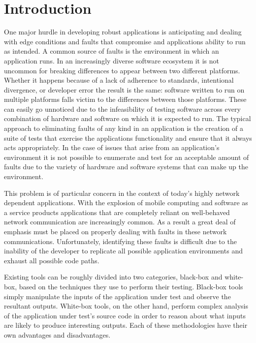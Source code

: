 \section{Introduction}

    One major hurdle in developing robust applications is anticipating and dealing with edge conditions and faults that
    compromise and applications ability to run as intended. A common source of faults is the environment in which an
    application runs. In an increasingly diverse software ecosystem it is not uncommon for breaking differences to
    appear between two different platforms. Whether it happens because of a lack of adherence to standards, intentional
    divergence, or developer error the result is the same: software written to run on multiple platforms falls victim to
    the differences between those platforms. These can easily go unnoticed due to the infeasibility of testing software
    across every combination of hardware and software on which it is expected to run. The typical approach to
    eliminating faults of any kind in an application is the creation of a suite of tests that exercise the applications
    functionality and ensure that it always acts appropriately. In the case of issues that arise from an application's
    environment it is not possible to enumerate and test for an acceptable amount of faults due to the variety of
    hardware and software systems that can make up the environment.

    This problem is of particular concern in the context of today's highly network dependent applications. With the
    explosion of mobile computing and software as a service products applications that are completely reliant on
    well-behaved network communication are increasingly common. As a result a great deal of emphasis must be placed on
    properly dealing with faults in these network communications. Unfortunately, identifying these faults is difficult
    due to the inability of the developer to replicate all possible application environments and exhaust all possible
    code paths.

    Existing tools can be roughly divided into two categories, black-box and white-box, based on the techniques they use
    to perform their testing. Black-box tools simply manipulate the inputs of the application under test and observe the
    resultant outputs. White-box tools, on the other hand, perform complex analysis of the application under test's
    source code in order to reason about what inputs are likely to produce interesting outputs. Each of these
    methodologies have their own advantages and disadvantages.

